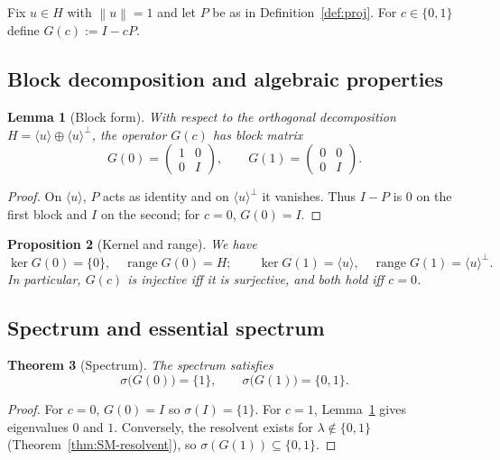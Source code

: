 \documentclass[11pt]{article}
\newtheorem{theorem}{Theorem}[section]
\newtheorem{proposition}[theorem]{Proposition}
\newtheorem{lemma}[theorem]{Lemma}
\theoremstyle{definition}
\newcommand{\norm}[1]{\left\lVert #1\right\rVert}
\DeclareMathOperator{\range}{range}
\DeclareMathOperator{\kerop}{ker}
\begin{document}
Fix $u\in H$ with $\norm{u}=1$ and let $P$ be as in Definition~\ref{def:proj}. For $c\in\{0,1\}$ define $G(c):=I-cP$.

\subsection{Block decomposition and algebraic properties}

\begin{lemma}[Block form]\label{lem:block}
With respect to the orthogonal decomposition $H=\langle u\rangle\oplus \langle u\rangle^\perp$, the operator $G(c)$ has block matrix
\[
G(0)=\begin{pmatrix}1&0\\[2pt]0&I\end{pmatrix},\qquad
G(1)=\begin{pmatrix}0&0\\[2pt]0&I\end{pmatrix}.
\]
\end{lemma}

\begin{proof}
On $\langle u\rangle$, $P$ acts as identity and on $\langle u\rangle^\perp$ it vanishes. Thus $I-P$ is $0$ on the first block and $I$ on the second; for $c=0$, $G(0)=I$.
\end{proof}

\begin{proposition}[Kernel and range]\label{prop:ker-range}
We have
\[
\kerop G(0)=\{0\},\quad \range G(0)=H;\qquad
\kerop G(1)=\langle u\rangle,\quad \range G(1)=\langle u\rangle^\perp.
\]
In particular, $G(c)$ is injective iff it is surjective, and both hold iff $c=0$.
\end{proposition}

\subsection{Spectrum and essential spectrum}

\begin{theorem}[Spectrum]\label{thm:spectrum}
The spectrum satisfies
\[
\sigma\big(G(0)\big)=\{1\},\qquad \sigma\big(G(1)\big)=\{0,1\}.
\]
\end{theorem}

\begin{proof}
For $c=0$, $G(0)=I$ so $\sigma(I)=\{1\}$. For $c=1$, Lemma~\ref{lem:block} gives eigenvalues $0$ and $1$. Conversely, the resolvent exists for $\lambda\notin\{0,1\}$ (Theorem~\ref{thm:SM-resolvent}), so $\sigma(G(1))\subseteq\{0,1\}$.
\end{proof}
\end{document}
